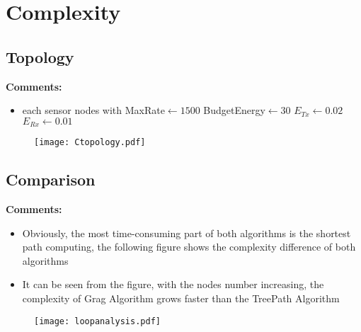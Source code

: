 \section{Complexity}
\subsection{Topology}
\textbf{Comments:}
\begin{itemize}
\item each sensor nodes with MaxRate$\leftarrow 1500$ BudgetEnergy$\leftarrow 30$ $E_{Tx}\leftarrow 0.02$ $E_{Rx}\leftarrow 0.01$
\end{itemize}
\begin{figure}[h]
\centering
\texttt{[image: Ctopology.pdf]}
\end{figure}

\subsection{Comparison}
\textbf{Comments:}
\begin{itemize}
\item Obviously, the most time-consuming part of both algorithms is the shortest path computing, the following figure shows the complexity difference of both algorithms
\item It can be seen from the figure, with the nodes number increasing, the complexity of Grag Algorithm grows faster than the TreePath Algorithm
\end{itemize}
\begin{figure}[h]
\centering
\texttt{[image: loopanalysis.pdf]}
\end{figure}